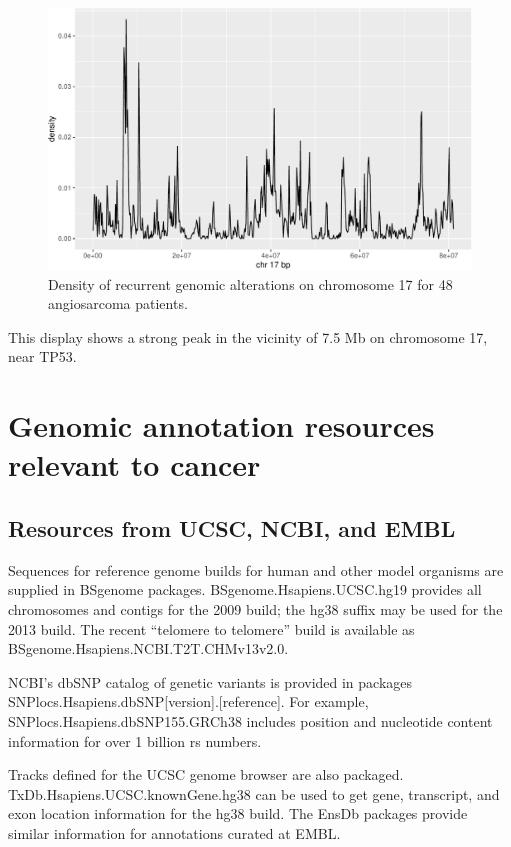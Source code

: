 \documentclass[]{article}
\begin{document}
\begin{figure}
\includegraphics[width=1\linewidth,]{bioccb_files/figure-latex/mkden-1} \caption{Density of recurrent genomic alterations on chromosome 17 for 48 angiosarcoma patients.}\label{fig:mkden}
\end{figure}

This display shows a strong peak in the vicinity of 7.5 Mb on chromosome 17, near TP53.

\hypertarget{hubs}{%
\section{Genomic annotation resources relevant to cancer}\label{hubs}}

\hypertarget{resources-from-ucsc-ncbi-and-embl}{%
\subsection{Resources from UCSC, NCBI, and EMBL}\label{resources-from-ucsc-ncbi-and-embl}}

Sequences for reference genome builds for human and
other model organisms are supplied in BSgenome packages.
BSgenome.Hsapiens.UCSC.hg19 provides all chromosomes and
contigs for the 2009 build; the hg38 suffix may be used
for the 2013 build. The recent ``telomere to telomere''
build is available as BSgenome.Hsapiens.NCBI.T2T.CHMv13v2.0.

NCBI's dbSNP catalog of genetic variants is provided
in packages SNPlocs.Hsapiens.dbSNP{[}version{]}.{[}reference{]}.
For example, SNPlocs.Hsapiens.dbSNP155.GRCh38 includes
position and nucleotide content information for over
1 billion rs numbers.

Tracks defined for the UCSC genome browser are also
packaged. TxDb.Hsapiens.UCSC.knownGene.hg38 can be
used to get gene, transcript, and exon location information
for the hg38 build. The EnsDb packages provide similar
information for annotations curated at EMBL.
\end{document}
